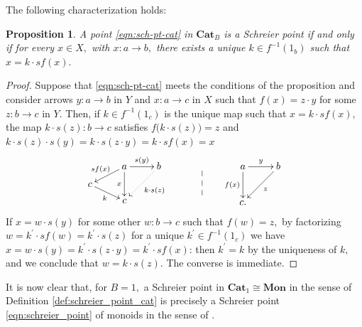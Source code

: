 \documentclass[11pt]{amsart}
\theoremstyle{plain}
\newtheorem{proposition}[subsubsection]{Proposition}
\theoremstyle{definition}
\theoremstyle{remark}
\begin{document}
The following characterization holds:
\begin{proposition}
\label{prop:char_schreier_points}
A point \eqref{eqn:sch-pt-cat} in $\mathbf{Cat}_B$ is a Schreier point if and only if for every $x\in X,$ with $x\colon a\rightarrow b,$ there exists a unique $k\in f^{-1}(1_b)$ such that $x=k\cdot sf(x).$
\end{proposition}
\begin{proof}
Suppose that \eqref{eqn:sch-pt-cat} meets the conditions of the proposition and consider arrows $y\colon a\rightarrow b$ in $Y$ and $x\colon a\rightarrow c$ in $X$ such that $f(x)=z\cdot y$ for some $z\colon b\rightarrow c$ in $Y.$ Then, if $k\in f^{-1}(1_c)$ is the unique map such that $x=k\cdot sf(x),$ the map $k\cdot s(z)\colon b\rightarrow c$ satisfies $f\big(k\cdot s(z)\big)=z$ and $k\cdot s(z)\cdot s(y)=k\cdot s(z\cdot y)=k\cdot sf(x)=x$
\begin{equation*}
\centering
\xymatrixrowsep{0.5pc}
\xymatrix{
&a \ar[ld]_-{sf(x)} \ar[r]^-{s(y)} \ar[dd]_-x &b \ar@{.>}[ldd]^-{k\cdot s(z)} \\
c \ar[rd]_-k &\ &\ \\
&c  &\
}
\xymatrixrowsep{2pc}
\xymatrix{
&\ \ar@{--}[d] \\
&\
}
\xymatrix{
&a  \ar[d]_-{f(x)}  \ar[r]^-{y} &b \ar[dl]^-{z} \\
&{c.} &\
}
\end{equation*}
If $x=w\cdot s(y)$ for some other $w\colon b\rightarrow c$ such that $f(w)=z,$ by factorizing $w=k^\prime\cdot sf(w)=k^\prime\cdot s(z)$ for a unique $k^\prime\in f^{-1}(1_c)$ we have $x=w\cdot s(y)=k^\prime\cdot s(z\cdot y)=k^\prime\cdot sf(x)$: then $k^\prime=k$ by the uniqueness of $k,$ and we conclude that $w=k\cdot s(z).$ The converse is immediate.
\end{proof}
It is now clear that, for $B=1,$ a Schreier point in $\mathbf{Cat}_1\cong\mathbf{Mon}$ in the sense of Definition \ref{def:schreier_point_cat} is precisely a Schreier point \eqref{eqn:schreier_point} of monoids in the sense of \cite{MMS13}.
\end{document}
